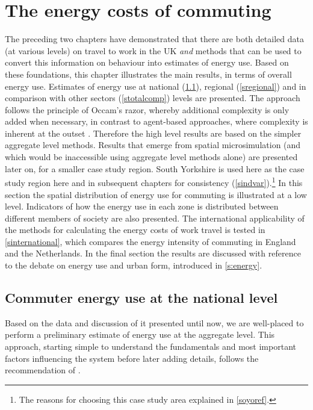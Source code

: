 \documentclass[a4paper, 11pt, twoside]{Thesis}
\begin{document}
\chapter{The energy costs of commuting}
\label{Chapter6}
\fancyhead[RE,LO]{\thepage}
The preceding two chapters have demonstrated that there are both detailed
data (at various levels) on travel to work in the UK \emph{and} methods
that can be used to convert this information on behaviour
into estimates of energy use. Based
on these foundations, this chapter illustrates the main results, in terms
of overall energy use. 
Estimates of
energy use at national (\cref{snational}), regional (\cref{sregional}) and
in comparison with other sectors (\cref{stotalcomp}) levels are presented.
The approach follows the
principle of Occam's razor, whereby additional complexity is only added when
necessary, in contrast to agent-based approaches, where complexity is inherent at the
outset \citep{batty2012perspectives}.
Therefore the high level results are based on the simpler
aggregate level methods. Results that emerge from spatial microsimulation
(and which would be inaccessible using aggregate level methods alone) are presented
later on, for a smaller case study region. South Yorkshire is used here
as the case study region here and in subsequent chapters for consistency
(\cref{sindvar}).\footnote{The
reasons for choosing this case study area explained in \cref{soyoref}.
}
In this section the spatial distribution of energy use for commuting is
illustrated at a low level. Indicators of how the energy use
in each zone is distributed between different members of society are also
presented.
The international applicability of the
methods for calculating the energy costs of work travel
is tested in \cref{sinternational}, which
compares the energy intensity of commuting in England and the Netherlands.
In the final section the results are discussed with
reference to the debate on energy use and urban form, introduced in
\cref{s:energy}. 

\section{Commuter energy use at the national level} \label{snational}
Based on the data and discussion of it presented until now, we are
well-placed to perform a preliminary estimate of energy use at the aggregate level.
This approach, starting simple to understand the fundamentals and most important
factors influencing the system before later adding details, follows the
recommendation of \citet{batty1976urban}.
\end{document}
